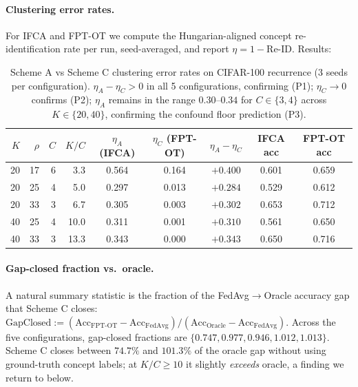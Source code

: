 \paragraph{Clustering error rates.}
For IFCA and FPT-OT we compute the Hungarian-aligned concept re-identification rate per run, seed-averaged, and report $\eta = 1 - \text{Re-ID}$. Results:

\begin{table}[h]
\centering
\caption{Scheme A vs Scheme C clustering error rates on CIFAR-100 recurrence (3 seeds per configuration). $\eta_A - \eta_C > 0$ in all 5 configurations, confirming (P1); $\eta_C \to 0$ confirms (P2); $\eta_A$ remains in the range $0.30$--$0.34$ for $C \in \{3, 4\}$ across $K \in \{20, 40\}$, confirming the confound floor prediction (P3).}
\label{tab:protocol_eta}
\small
\begin{tabular}{rrrrccccc}
\toprule
$K$ & $\rho$ & $C$ & $K/C$ & $\eta_A$ (IFCA) & $\eta_C$ (FPT-OT) & $\eta_A - \eta_C$ & IFCA acc & FPT-OT acc \\
\midrule
20 & 17 & 6 & 3.3  & 0.564 & 0.164 & $+0.400$ & 0.601 & 0.659 \\
20 & 25 & 4 & 5.0  & 0.297 & 0.013 & $+0.284$ & 0.529 & 0.612 \\
20 & 33 & 3 & 6.7  & 0.305 & 0.003 & $+0.302$ & 0.653 & 0.712 \\
40 & 25 & 4 & 10.0 & 0.311 & 0.001 & $+0.310$ & 0.561 & 0.650 \\
40 & 33 & 3 & 13.3 & 0.343 & 0.000 & $+0.343$ & 0.650 & 0.716 \\
\bottomrule
\end{tabular}
\end{table}

\paragraph{Gap-closed fraction vs.\ oracle.}
A natural summary statistic is the fraction of the FedAvg$\to$Oracle accuracy gap that Scheme C closes:
$\mathrm{GapClosed} := (\mathrm{Acc}_{\mathrm{FPT\text{-}OT}} - \mathrm{Acc}_{\mathrm{FedAvg}}) / (\mathrm{Acc}_{\mathrm{Oracle}} - \mathrm{Acc}_{\mathrm{FedAvg}})$.
Across the five configurations, gap-closed fractions are $\{0.747, 0.977, 0.946, 1.012, 1.013\}$. Scheme C closes between $74.7\%$ and $101.3\%$ of the oracle gap without using ground-truth concept labels; at $K/C \ge 10$ it slightly \emph{exceeds} oracle, a finding we return to below.

